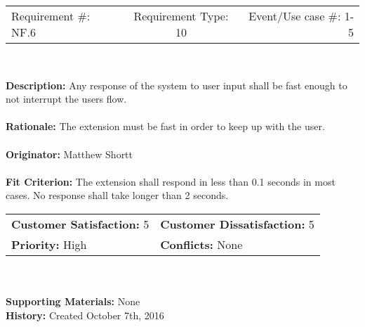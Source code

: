 \documentclass[12pt, titlepage]{article}
\begin{document}
\begin{framed}
	
	\begin{center}
		
		\begin{tabular}{ l c r }
			Requirement \#: NF.6 & Requirement Type: 10 & Event/Use case \#: 1-5 \\
		\end{tabular} \\
	\end{center}
	\textbf{Description:} Any response of the system to user input shall be fast enough to 
	not interrupt the users flow.\\
	\\
	\textbf{Rationale:} The extension must be fast in order to keep up with the user.  \\
	\\
	\textbf{Originator:} Matthew Shortt \\
	\\
	\textbf{Fit Criterion:} The extension shall respond in less than 0.1 seconds in most 
	cases. No response shall take longer than 2 seconds. 
	\\
	
	\begin{tabular}{ll}
		\textbf{Customer Satisfaction:} 5 & \textbf{Customer Dissatisfaction:} 5 \\
		\textbf{Priority:} High & \textbf{Conflicts:} None\\
	\end{tabular} \\
	\\
	\textbf{Supporting Materials:} None \\
	\textbf{History:} Created October 7th, 2016
	
\end{framed}
\end{document}
